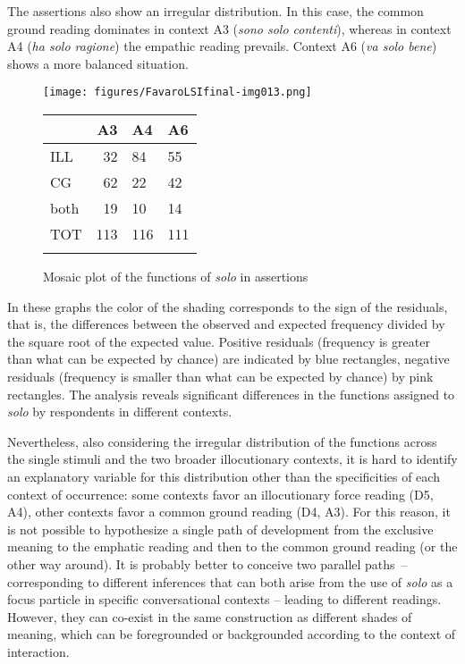 The assertions also show an irregular distribution. In this case, the common ground reading dominates in context A3 (\textit{sono solo contenti}), whereas in context A4 (\textit{ha solo ragione}) the empathic reading prevails. Context A6 (\textit{va solo bene}) shows a more balanced situation.



\begin{figure}
\texttt{[image: figures/FavaroLSIfinal-img013.png]}


\begin{tabularx}{0.6\textwidth}{XrYY}
\lsptoprule
 & A3 & A4 & A6\\
\midrule
 ILL & 32 & 84 & 55\\
 CG & 62 & 22 & 42\\
 both & 19 & 10 & 14\\
 TOT & 113 & 116 & 111\\
\lspbottomrule
\end{tabularx}
\caption{Mosaic plot of the functions of \textit{solo} in assertions}
\label{fig:key:8.13}
\end{figure}

In these graphs the color of the shading corresponds to the sign of the residuals, that is, the differences between the observed and expected frequency divided by the square root of the expected value. Positive residuals (frequency is greater than what can be expected by chance) are indicated by blue rectangles, negative residuals (frequency is smaller than what can be expected by chance) by pink rectangles. The analysis reveals significant differences in the functions assigned to \textit{solo} by respondents in different contexts.

\hspace*{-.1pt}Nevertheless, also considering the irregular distribution of the functions across the single stimuli and the two broader illocutionary contexts, it is hard to identify an explanatory variable for this distribution other than the specificities of each context of occurrence: some contexts favor an illocutionary force reading (D5, A4), other contexts favor a common ground reading (D4, A3). For this reason, it is not possible to hypothesize a single path of development from the exclusive meaning to the emphatic reading and then to the common ground reading (or the other way around). It is probably better to conceive two parallel paths~– corresponding to different inferences that can both arise from the use of \textit{solo} as a focus particle in specific conversational contexts – leading to different readings. However, they can co-exist in the same construction as different shades of meaning, which can be foregrounded or backgrounded according to the context of interaction.

